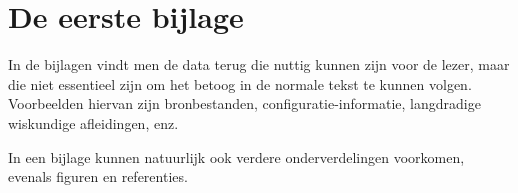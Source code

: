 \chapter{De eerste bijlage}
\label{app:A}
In de bijlagen vindt men de data terug die nuttig kunnen zijn voor de
lezer, maar die niet essentieel zijn om het betoog in de normale tekst te
kunnen volgen. Voorbeelden hiervan zijn bronbestanden,
configuratie-informatie, langdradige wiskundige afleidingen, enz.

In een bijlage kunnen natuurlijk ook verdere onderverdelingen voorkomen,
evenals figuren en referenties\cite{h2g2}.





